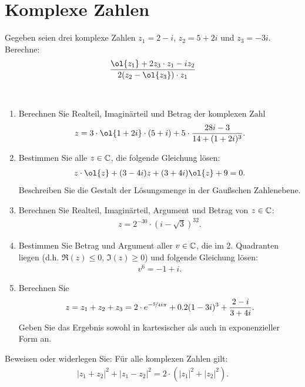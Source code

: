 \section{Komplexe Zahlen}

\begin{ejercicio}
    Gegeben seien drei komplexe Zahlen $z_1 = 2 - i$, $z_2 = 5 + 2i$ und $z_3 = -3i$. Berechne:
    \begin{align*}
        \dfrac{\ol{z_1} + 2z_3 \cdot z_1 - iz_2}{2 (z_2 - \ol{z_3}) \cdot z_1}
    \end{align*}
\end{ejercicio}

\begin{ejercicio}~
\begin{enumerate}
    \item Berechnen Sie Realteil, Imaginärteil und Betrag der komplexen Zahl
    \begin{align*}
        z = 3 \cdot \ol{1+2i} \cdot (5 + i) + 5 \cdot \dfrac{28i - 3}{14 + (1 + 2i)^3}.
    \end{align*}

    \item Bestimmen Sie alle $z \in \mathbb{C}$, die folgende Gleichung lösen:
    \begin{align*}
        z \cdot \ol{z} + (3 - 4i) z + (3 + 4i) \ol{z} + 9 = 0.
    \end{align*}
    Beschreiben Sie die Gestalt der Lösungsmenge in der Gaußschen Zahlenebene.

    \item Berechnen Sie Realteil, Imaginärteil, Argument und Betrag von $z \in \mathbb{C}$:
    \begin{align*}
        z = 2^{-30} \cdot \left(i - \sqrt{3}\right)^{32}.
    \end{align*}

    \item Bestimmen Sie Betrag und Argument aller $v \in \mathbb{C}$, die im 2. Quadranten liegen (d.h. $\Re(z) \leq 0$, $\Im(z) \geq 0$) und folgende Gleichung lösen:
    \begin{align*}
        v^6 = -1 + i.
    \end{align*}

    \item Berechnen Sie
    \begin{align*}
        z = z_1 + z_2 + z_3 = 2 \cdot e^{-\nicefrac{5}{4} i \pi} + 0.2(1 - 3i)^3 + \dfrac{2 - i}{3 + 4i}.
    \end{align*}
    Geben Sie das Ergebnis sowohl in kartesischer als auch in exponenzieller Form an.
\end{enumerate}
\end{ejercicio}

\begin{ejercicio}
    Beweisen oder widerlegen Sie: Für alle komplexen Zahlen gilt:
    \begin{align*}
        |z_1 + z_2|^2 + |z_1 - z_2|^2 = 2 \cdot \left(|z_1|^2 + |z_2|^2\right).
    \end{align*}
\end{ejercicio}